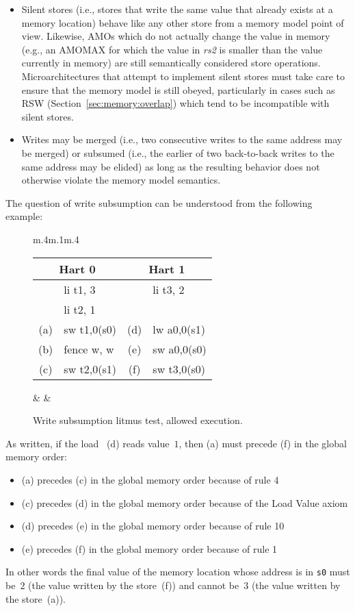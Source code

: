 \begin{itemize}
  \item Silent stores (i.e., stores that write the same value that already exists at a memory location) behave like any other store from a memory model point of view.  Likewise, AMOs which do not actually change the value in memory (e.g., an AMOMAX for which the value in {\em rs2} is smaller than the value currently in memory) are still semantically considered store operations.  Microarchitectures that attempt to implement silent stores must take care to ensure that the memory model is still obeyed, particularly in cases such as RSW (Section~\ref{sec:memory:overlap}) which tend to be incompatible with silent stores.
  \item Writes may be merged (i.e., two consecutive writes to the same address may be merged) or subsumed (i.e., the earlier of two back-to-back writes to the same address may be elided) as long as the resulting behavior does not otherwise violate the memory model semantics.
\end{itemize}

The question of write subsumption can be understood from the following example:
\begin{figure}[h!]
  \centering
  \begin{tabular}{m{.4\linewidth}m{.1\linewidth}m{.4\linewidth}}
    \tt\small
    \begin{tabular}{cl||cl}
    \multicolumn{2}{c}{Hart 0} & \multicolumn{2}{c}{Hart 1} \\
    \hline
        & li t1, 3    &     & li  t3, 2    \\
        & li t2, 1    &     &              \\
    (a) & sw t1,0(s0) & (d) & lw  a0,0(s1) \\
    (b) & fence w, w  & (e) & sw  a0,0(s0) \\
    (c) & sw t2,0(s1) & (f) & sw  t3,0(s0) \\
    \end{tabular}
  & &
    
  \end{tabular}
  \caption{Write subsumption litmus test, allowed execution.}
  \label{fig:litmus:subsumption}
\end{figure}

As written, if the load ~(d) reads value~$1$, then (a) must precede (f) in the global memory order:
\begin{itemize}
  \item (a) precedes (c) in the global memory order because of rule 4
  \item (c) precedes (d) in the global memory order because of the Load Value axiom
  \item (d) precedes (e) in the global memory order because of rule 10
  \item (e) precedes (f) in the global memory order because of rule 1
\end{itemize}
In other words the final value of the memory location whose address is in {\tt s0} must be~$2$ (the value written by the store~(f)) and cannot be~$3$ (the value written by the store~(a)).


